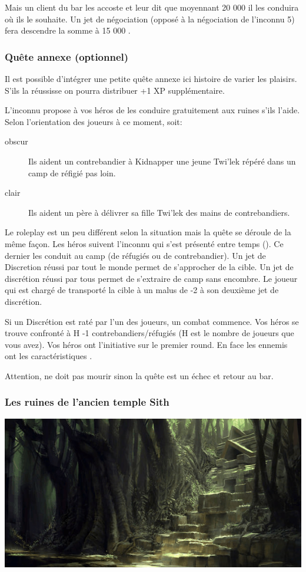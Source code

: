 Mais un client du bar les accoste et leur dit que moyennant 20 000 \crg il les conduira où ils le souhaite. Un jet de négociation (opposé à la négociation de l'inconnu 5) fera descendre la somme à 15 000 \crg.

\subsubsection{Quête annexe (optionnel)}
Il est possible d'intégrer une petite quête annexe ici histoire de varier les plaisirs. S'ils la réussisse on pourra distribuer +1 XP supplémentaire.

L'inconnu propose à vos héros de les conduire gratuitement aux ruines s'ils l'aide. Selon l'orientation des joueurs à ce moment, soit:
\begin{description}
    \item [obscur] Ils aident un contrebandier à Kidnapper une jeune Twi'lek répéré dans un camp de réfigié pas loin.
    \item [clair] Ils aident un père à délivrer sa fille Twi'lek des mains de contrebandiers.
\end{description}

Le roleplay est un peu différent selon la situation mais la quête se déroule de la même façon. Les héros suivent l'inconnu qui s'est présenté entre temps (). Ce dernier les conduit au camp (de réfugiés ou de contrebandier). Un jet de Discretion réussi par tout le monde permet de s'approcher de la cible. Un jet de discrétion réussi par tous permet de s'extraire de camp sans encombre. Le joueur qui est chargé de transporté la cible à un malus de -2 à son deuxième jet de discrétion.

Si un Discrétion est raté par l'un des joueurs, un combat commence. Vos héros se trouve confronté à H -1 contrebandiers/réfugiés (H est le nombre de joueurs que vous avez). Vos héros ont l'initiative sur le premier round. En face les ennemis ont les caractéristiques .

Attention,  ne doit pas mourir sinon la quête est un échec et retour au bar. 

\subsubsection{Les ruines de l'ancien temple Sith}
\noindent\includegraphics[width=\linewidth]{_img/dos-au-muur/taris-temple-sith.png}

